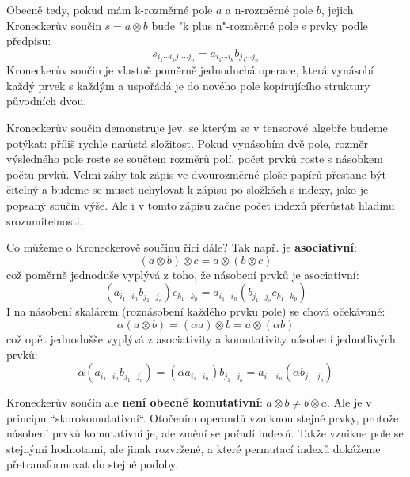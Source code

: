 \documentclass[a5paper,12pt]{amsbook}
\theoremstyle{definition}
\begin{document}
Obecně tedy, pokud mám k-rozměrné pole $a$ a n-rozměrné pole $b$, jejich Kroneckerův součin 
$s = a \otimes b$ bude "k plus n"-rozměrné pole s prvky podle předpisu:
\begin{equation*}
s_{i_1 \cdots i_k j_1 \cdots j_n} = a_{i_1 \cdots i_k} b_{j_1 \cdots j_n}
\end{equation*}
Kroneckerův součin je vlastně poměrně jednoduchá operace, která vynásobí každý prvek s každým
a uspořádá je do nového pole kopírujícího struktury původních dvou.

Kroneckerův součin demonstruje jev, se kterým se v tensorové algebře budeme potýkat: příliš rychle
narůstá složitost. Pokud vynásobím dvě pole, rozměr výsledného pole roste se součtem rozměrů polí,
počet prvků roste s násobkem počtu prvků. Velmi záhy tak zápis ve dvourozměrné ploše papírů přestane
být čitelný a budeme se muset uchylovat k zápisu po složkách s indexy, jako je popsaný součin výše.
Ale i v tomto zápisu začne počet indexů přerůstat hladinu srozumitelnosti.

Co můžeme o Kroneckerově součinu říci dále? Tak např. je \textbf{asociativní}:
\begin{equation*}
(a \otimes b) \otimes c = a \otimes (b \otimes c)
\end{equation*}
což poměrně jednoduše vyplývá z toho, že násobení prvků je asociativní:
\begin{equation*}
(a_{i_1 \cdots i_n} b_{j_1 \cdots j_o})c_{k_1 \cdots k_p} = a_{i_1 \cdots i_n} (b_{j_1 \cdots j_o} c_{k_1 \cdots k_p})
\end{equation*}
I na násobení skalárem (roznásobení každého prvku pole) se chová očekávaně:
\begin{equation*}
\alpha (a \otimes b) = (\alpha a) \otimes b = a \otimes (\alpha b)
\end{equation*}
což opět jednodušše vyplývá z asociativity a komutativity násobení jednotlivých prvků:
\begin{equation*}
\alpha (a_{i_1 \cdots i_n} b_{j_1 \cdots j_o}) = (\alpha a_{i_1 \cdots i_n}) b_{j_1 \cdots j_o}
= a_{i_1 \cdots i_n} (\alpha b_{j_1 \cdots j_o})
\end{equation*}

Kroneckerův součin ale \textbf{není obecně komutativní}: $a \otimes b \neq b \otimes a$. Ale
je v principu ``skorokomutativní``. Otočením operandů vzniknou stejné prvky, protože násobení
prvků komutativní je, ale změní se pořadí indexů. Takže vznikne pole se stejnými hodnotami,
ale jinak rozvržené, a které permutací indexů dokážeme přetransformovat do stejné podoby.
\end{document}
